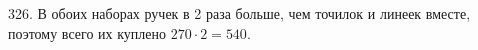 326. В обоих наборах ручек в 2 раза больше, чем точилок и линеек вместе, поэтому всего их куплено $270\cdot2=540.$\\
